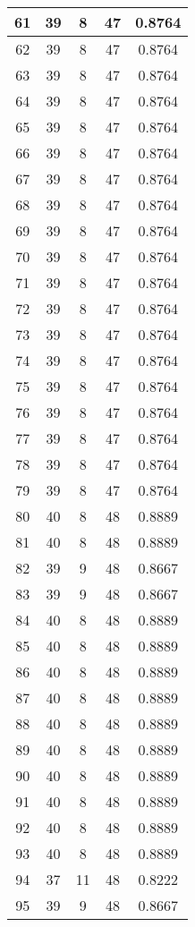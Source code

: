 \documentclass[letterpaper, 12pt]{article}
\begin{document}
\begin{longtable}{|c|c|c|c|c|}
61 & 39 & 8 & 47 & 0.8764 \\
\hline
62 & 39 & 8 & 47 & 0.8764 \\
\hline
63 & 39 & 8 & 47 & 0.8764 \\
\hline
64 & 39 & 8 & 47 & 0.8764 \\
\hline
65 & 39 & 8 & 47 & 0.8764 \\
\hline
66 & 39 & 8 & 47 & 0.8764 \\
\hline
67 & 39 & 8 & 47 & 0.8764 \\
\hline
68 & 39 & 8 & 47 & 0.8764 \\
\hline
69 & 39 & 8 & 47 & 0.8764 \\
\hline
70 & 39 & 8 & 47 & 0.8764 \\
\hline
71 & 39 & 8 & 47 & 0.8764 \\
\hline
72 & 39 & 8 & 47 & 0.8764 \\
\hline
73 & 39 & 8 & 47 & 0.8764 \\
\hline
74 & 39 & 8 & 47 & 0.8764 \\
\hline
75 & 39 & 8 & 47 & 0.8764 \\
\hline
76 & 39 & 8 & 47 & 0.8764 \\
\hline
77 & 39 & 8 & 47 & 0.8764 \\
\hline
78 & 39 & 8 & 47 & 0.8764 \\
\hline
79 & 39 & 8 & 47 & 0.8764 \\
\hline
80 & 40 & 8 & 48 & 0.8889 \\
\hline
81 & 40 & 8 & 48 & 0.8889 \\
\hline
82 & 39 & 9 & 48 & 0.8667 \\
\hline
83 & 39 & 9 & 48 & 0.8667 \\
\hline
84 & 40 & 8 & 48 & 0.8889 \\
\hline
85 & 40 & 8 & 48 & 0.8889 \\
\hline
86 & 40 & 8 & 48 & 0.8889 \\
\hline
87 & 40 & 8 & 48 & 0.8889 \\
\hline
88 & 40 & 8 & 48 & 0.8889 \\
\hline
89 & 40 & 8 & 48 & 0.8889 \\
\hline
90 & 40 & 8 & 48 & 0.8889 \\
\hline
91 & 40 & 8 & 48 & 0.8889 \\
\hline
92 & 40 & 8 & 48 & 0.8889 \\
\hline
93 & 40 & 8 & 48 & 0.8889 \\
\hline
94 & 37 & 11 & 48 & 0.8222 \\
\hline
95 & 39 & 9 & 48 & 0.8667 \\

\end{longtable}
\end{document}
